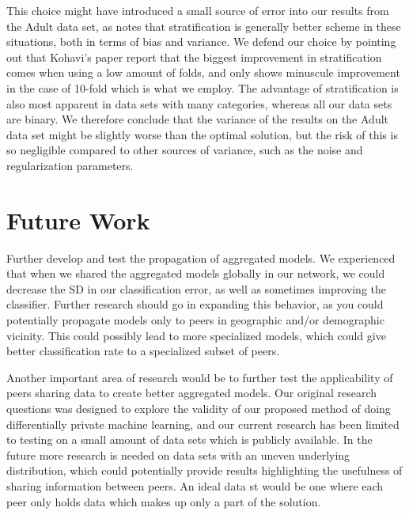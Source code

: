 This choice might have introduced a small source of error into our results from the Adult data set, as \cite{kohavi1995crossvalidation} notes that stratification is generally better scheme in these situations, both in terms of bias and variance. We defend our choice by pointing out that Kohavi's paper report that the biggest improvement in stratification comes when using a low amount of folds, and only shows minuscule improvement in the case of 10-fold which is what we employ. The advantage of stratification is also most apparent in data sets with many categories, whereas all our data sets are binary. We therefore conclude that the variance of the results on the Adult data set might be slightly worse than the optimal solution, but the risk of this is so negligible compared to other sources of variance, such as the noise and regularization parameters.     

\section{Future Work} \label{sec:Future Work}

Further develop and test the propagation of aggregated models. We experienced that when we shared the aggregated models globally in our network, we could decrease the SD in our classification error, as well as sometimes improving the classifier. Further research should go in expanding this behavior, as you could potentially propagate models only to peers in geographic and/or demographic vicinity. This could possibly lead to more specialized models, which could give better classification rate to a specialized subset of peers. 

Another important area of research would be to further test the applicability of peers sharing data to create better aggregated models. Our original research questions was designed to explore the validity of our proposed method of doing differentially private machine learning, and our current research has been limited to testing on a small amount of data sets which is publicly available. In the future more research is needed on data sets with an uneven underlying distribution, which could potentially provide results highlighting the usefulness of sharing information between peers. An ideal data st would be one where each peer only holds data which makes up only a part of the solution. 

